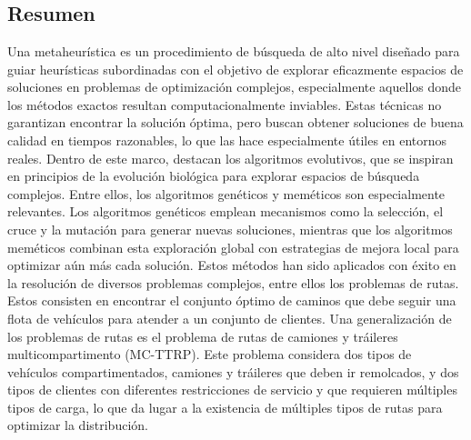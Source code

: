 \documentclass[11pt,a4paper]{book}
\theoremstyle{definition}
\theoremstyle{remark}
\begin{document}
\clearpage

\thispagestyle{empty}

\tableofcontents

\clearpage

\thispagestyle{empty}

\mbox{}

\clearpage


{}		
\chapter*{}

\section*{Resumen}

Una metaheurística es un procedimiento de búsqueda de alto nivel diseñado para guiar heurísticas subordinadas con el objetivo de explorar eficazmente espacios de soluciones en problemas de optimización complejos, especialmente aquellos donde los métodos exactos resultan computacionalmente inviables. Estas técnicas no garantizan encontrar la solución óptima, pero buscan obtener soluciones de buena calidad en tiempos razonables, lo que las hace especialmente útiles en entornos reales. Dentro de este marco, destacan los algoritmos evolutivos, que se inspiran en principios de la evolución biológica para explorar espacios de búsqueda complejos. Entre ellos, los algoritmos genéticos y meméticos son especialmente relevantes. Los algoritmos genéticos emplean mecanismos como la selección, el cruce y la mutación para generar nuevas soluciones, mientras que los algoritmos meméticos combinan esta exploración global con estrategias de mejora local para optimizar aún más cada solución. Estos métodos han sido aplicados con éxito en la resolución de diversos problemas complejos, entre ellos los problemas de rutas. Estos consisten en encontrar el conjunto óptimo de caminos que debe seguir una flota de vehículos para atender a un conjunto de clientes. Una generalización de los problemas de rutas es el problema de rutas de camiones y tráileres multicompartimento (MC-TTRP). Este problema considera dos tipos de vehículos compartimentados, camiones y tráileres que deben ir remolcados, y dos tipos de clientes con diferentes restricciones de servicio y que requieren múltiples tipos de carga, lo que da lugar a la existencia de múltiples tipos de rutas para optimizar la distribución.\\
\end{document}
